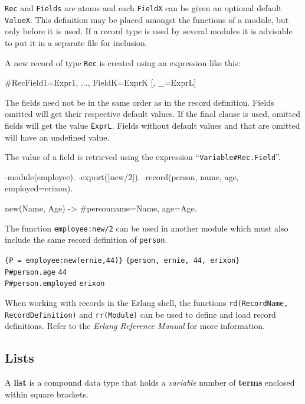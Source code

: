 \texttt{Rec} and \texttt{Fields} are atoms and each \texttt{FieldX}
can be given an optional default \texttt{ValueX}. This definition may
be placed amongst the functions of a module, but only before it is used.  If a record type is
used by several modules it is advisable to put it in a separate file for inclusion.

A new record of type \texttt{Rec} is created using an expression like this:

\begin{erlang}
#Rec{Field1=Expr1, ..., FieldK=ExprK [, _=ExprL]}
\end{erlang}

The fields need not be in the same order as in the record
definition. Fields omitted will get their respective default
values. If the final clause is used, omitted fields will get the value
\texttt{ExprL}. Fields without default values and that are omitted
will have an undefined value.

The value of a field is retrieved using the expression
``\texttt{Variable\#Rec.Field}''.

\begin{erlang}
-module(employee).
-export([new/2]).
-record(person, {name, age, employed=erixon}).

new(Name, Age) -> #person{name=Name, age=Age}.
\end{erlang}

The function \texttt{employee:new/2} can be used in another module
which must also include the same record definition of \texttt{person}.

\texttt{\{P = employee:new(ernie,44)\}} \resultingin \texttt{\{person, ernie, 44,
erixon\}} \\
\texttt{P\#person.age} \resultingin \texttt{44} \\
\texttt{P\#person.employed} \resultingin \texttt{erixon}

When working with records in the Erlang shell, the functions \texttt{rd(RecordName, RecordDefinition)} and \texttt{rr(Module)} can be used to
define and load record definitions.  Refer to the \textit{Erlang Reference Manual} for more information.


\subsection{Lists}
\label{datatypes:list}
A \textbf{list} is a compound data type that holds a \textit{variable}
number of \textbf{terms} enclosed within square brackets.

